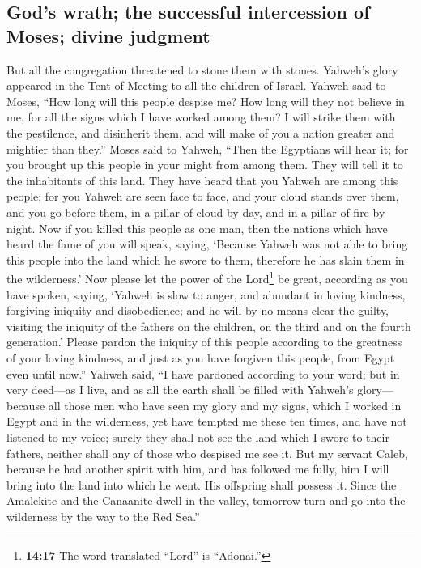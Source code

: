 \hypertarget{gods-wrath-the-successful-intercession-of-moses-divine-judgment}{%
\subsection{God's wrath; the successful intercession of Moses; divine
judgment}\label{gods-wrath-the-successful-intercession-of-moses-divine-judgment}}

 But all the congregation threatened to stone them with
stones. Yahweh's glory appeared in the Tent of Meeting to all the
children of Israel.  Yahweh said to Moses, ``How long
will this people despise me? How long will they not believe in me, for
all the signs which I have worked among them?  I will
strike them with the pestilence, and disinherit them, and will make of
you a nation greater and mightier than they.''  Moses
said to Yahweh, ``Then the Egyptians will hear it; for you brought up
this people in your might from among them.  They will
tell it to the inhabitants of this land. They have heard that you Yahweh
are among this people; for you Yahweh are seen face to face, and your
cloud stands over them, and you go before them, in a pillar of cloud by
day, and in a pillar of fire by night.  Now if you killed
this people as one man, then the nations which have heard the fame of
you will speak, saying,  `Because Yahweh was not able to
bring this people into the land which he swore to them, therefore he has
slain them in the wilderness.'  Now please let the power
of the Lord\footnote{\textbf{14:17} The word translated ``Lord'' is
  ``Adonai.''} be great, according as you have spoken, saying,
 `Yahweh is slow to anger, and abundant in loving
kindness, forgiving iniquity and disobedience; and he will by no means
clear the guilty, visiting the iniquity of the fathers on the children,
on the third and on the fourth generation.'  Please
pardon the iniquity of this people according to the greatness of your
loving kindness, and just as you have forgiven this people, from Egypt
even until now.''  Yahweh said, ``I have pardoned
according to your word;  but in very deed---as I live,
and as all the earth shall be filled with Yahweh's glory---
 because all those men who have seen my glory and my
signs, which I worked in Egypt and in the wilderness, yet have tempted
me these ten times, and have not listened to my voice; 
surely they shall not see the land which I swore to their fathers,
neither shall any of those who despised me see it.  But
my servant Caleb, because he had another spirit with him, and has
followed me fully, him I will bring into the land into which he went.
His offspring shall possess it.  Since the Amalekite and
the Canaanite dwell in the valley, tomorrow turn and go into the
wilderness by the way to the Red Sea.''

